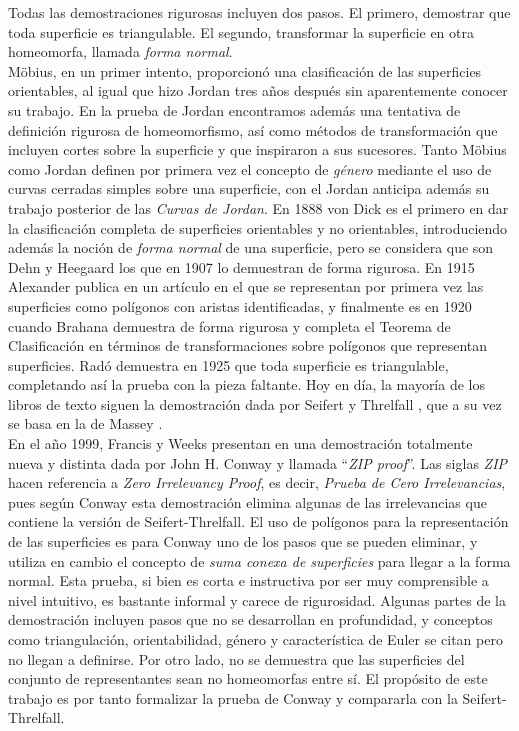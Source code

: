 \documentclass[10pt]{report}
\theoremstyle{definition}
\begin{document}
Todas las demostraciones rigurosas incluyen dos pasos. El primero, demostrar que toda superficie es triangulable. El segundo, transformar la superficie en otra homeomorfa, llamada \textit{forma normal}. \\
Möbius, en un primer intento, proporcionó una clasificación de las superficies orientables, al igual que hizo Jordan \cite{jordan} tres años después sin aparentemente conocer su trabajo. En la prueba de Jordan encontramos además una tentativa de definición rigurosa de homeomorfismo, así como métodos de transformación que incluyen cortes sobre la superficie y que inspiraron a sus sucesores. Tanto Möbius como Jordan definen por primera vez el concepto de \textit{género} mediante el uso de curvas cerradas simples sobre una superficie, con el Jordan anticipa además su trabajo posterior de las \textit{Curvas de Jordan}.
En 1888 von Dick \cite{vondick} es el primero en dar la clasificación completa de superficies orientables y no orientables, introduciendo además la noción de \textit{forma normal} de una superficie, pero se considera que son Dehn y Heegaard los que en 1907 \cite{dehn} lo demuestran de forma rigurosa. En 1915 Alexander publica en un artículo \cite{alexander} en el que se representan por primera vez las superficies como polígonos con aristas identificadas, y finalmente es en 1920 cuando Brahana \cite{brahana} demuestra de forma rigurosa y completa el Teorema de Clasificación en términos de transformaciones sobre polígonos que representan superficies. Radó \cite{rado} demuestra en 1925 que toda superficie es triangulable, completando así la prueba con la pieza faltante.
Hoy en día, la mayoría de los libros de texto siguen la demostración dada por Seifert y Threlfall \cite{seifert}, que a su vez se basa en la de Massey \cite{massey}.\\

En el año 1999, Francis y Weeks presentan en \cite{zip} una demostración totalmente nueva y distinta dada por John H. Conway y llamada ``\textit{ZIP proof}''. Las siglas \textit{ZIP} hacen referencia a \textit{Zero Irrelevancy Proof}, es decir, \textit{Prueba de Cero Irrelevancias}, pues según Conway esta demostración elimina algunas de las irrelevancias que contiene la versión de Seifert-Threlfall. El uso de polígonos para la representación de las superficies es para Conway uno de los pasos que se pueden eliminar, y utiliza en cambio el concepto de \textit{suma conexa de superficies} para llegar a la forma normal. Esta prueba, si bien es corta e instructiva por ser muy comprensible a nivel intuitivo, es bastante informal y carece de rigurosidad. Algunas partes de la demostración incluyen pasos que no se desarrollan en profundidad, y conceptos como triangulación, orientabilidad, género y característica de Euler se citan pero no llegan a definirse. Por otro lado, no se demuestra que las superficies del conjunto de representantes sean no homeomorfas entre sí. El propósito de este trabajo es por tanto formalizar la prueba de Conway y compararla con la Seifert-Threlfall.\\
\end{document}

